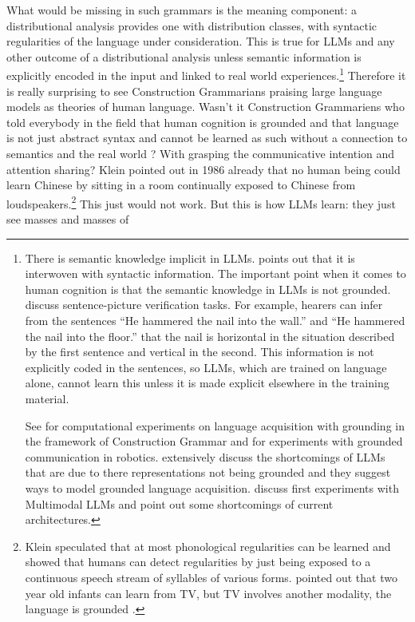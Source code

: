 What would be missing in such grammars is the meaning component: a distributional analysis provides
one with distribution classes, with syntactic regularities of the language under consideration. This
is true for LLMs and any other outcome of a distributional analysis unless semantic information is
explicitly encoded in the input and linked to real world experiences.\footnote{%
  There is semantic knowledge implicit in LLMs. \citet[358]{Piantadosi2024a} points out that it is
  interwoven with syntactic information. The important point when it comes to human cognition is
  that the semantic knowledge in LLMs is not grounded. \citet[2]{JonesBergenTrott2024a} discuss
  sentence-picture verification tasks. For example, hearers can infer from the sentences ``He
  hammered the nail into the wall.'' and ``He hammered the nail into the floor.'' that the nail is
  horizontal in the situation described by the first sentence and vertical in the second. This
  information is not explicitly coded in the sentences, so LLMs, which are trained on language
  alone, cannot learn this unless it is made explicit elsewhere in the training material.

See \citet{CM2001a} for computational experiments on language
  acquisition with grounding in the framework of Construction Grammar and \citet{Steels2003a} for
  experiments with grounded communication in robotics. \citet{BeulsVanEcke2024a} extensively
  discuss the shortcomings of LLMs that are due to there representations not being grounded and they
  suggest ways to model grounded language acquisition. \citet{JonesBergenTrott2024a} discuss first
  experiments with Multimodal LLMs and point out some shortcomings of current architectures.%
}
Therefore it is really surprising to see Construction Grammarians
praising large language models as theories of human language. Wasn't it Construction Grammariens who
told everybody in the field that human cognition is grounded
\citep{Barsalou2008a} and that language is not just abstract
syntax and cannot be learned as such without a connection to semantics and the real world
\parencites[44]{Klein86a-u}[113]{Tomasello2003a}[Section~4.2.3, 4.2.8]{AL2011a-u}? With grasping the communicative
intention and attention sharing? Klein pointed out in 1986 already that no human being could learn
Chinese by sitting in a room continually exposed to Chinese from loudspeakers.\footnote{%
Klein speculated that at most phonological regularities can be learned and \citet{NHSA2004a} showed
that humans can detect regularities by just being exposed to a continuous speech stream
of syllables of various forms. \citet[44]{Sogaard2023a} pointed out that two year old infants can learn
from TV, but TV involves another modality, the language is grounded \citep{Rice1983a}.
} This just would not work. But this is how LLMs learn: they just see masses and masses of
